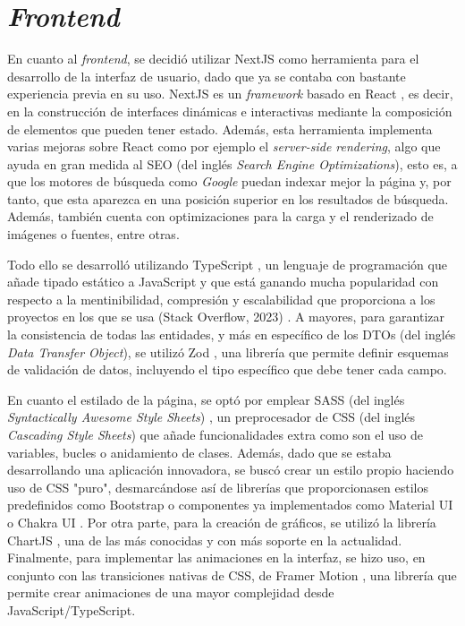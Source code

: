 \section{\textit{Frontend}}
\label{sec:herramientas_frontend}

En cuanto al \textit{frontend}, se decidió utilizar NextJS \cite{nextjs} como herramienta para el desarrollo de la interfaz de usuario, dado que ya
se contaba con bastante experiencia previa en su uso. NextJS es un \textit{framework} basado en React \cite{react}, es decir, en la construcción de interfaces dinámicas e interactivas mediante la composición
de elementos que pueden tener estado. Además, esta herramienta implementa varias mejoras sobre React como por ejemplo el \textit{server-side rendering}, algo que ayuda en gran medida
al SEO (del inglés \textit{Search Engine Optimizations}), esto es, a que los motores de búsqueda como \textit{Google} puedan indexar mejor la página y, por tanto, que esta aparezca en una posición superior en los resultados de búsqueda.
Además, también cuenta con optimizaciones para la carga y el renderizado de imágenes o fuentes, entre otras.

\bigskip
Todo ello se desarrolló utilizando TypeScript \cite{typescript}, un lenguaje de programación que añade tipado estático a JavaScript
y que está ganando mucha popularidad con respecto a la mentinibilidad, compresión y escalabilidad que proporciona a los proyectos en los que se usa (Stack Overflow, 2023) \cite{stackoverflow2023}.
A mayores, para garantizar la consistencia de todas las entidades, y más en específico de los DTOs (del inglés \textit{Data Transfer Object}), se utilizó Zod \cite{zod}, una librería que permite
definir esquemas de validación de datos, incluyendo el tipo específico que debe tener cada campo.

\bigskip
En cuanto el estilado de la página, se optó por emplear SASS (del inglés \textit{Syntactically Awesome Style Sheets}) \cite{sass}, un preprocesador de CSS (del inglés \textit{Cascading Style Sheets}) que añade
funcionalidades extra como son el uso de variables, bucles o anidamiento de clases. Además, dado que se estaba desarrollando
una aplicación innovadora, se buscó crear un estilo propio haciendo uso de CSS "puro", desmarcándose así de librerías que proporcionasen estilos predefinidos como Bootstrap \cite{bootstrap} o componentes ya implementados
como Material UI \cite{materialui} o Chakra UI \cite{chakraui}. Por otra parte, para la creación de gráficos, se utilizó la librería ChartJS \cite{chartjs}, una de las más conocidas
y con más soporte en la actualidad. Finalmente, para implementar las animaciones en la interfaz, se hizo uso, en conjunto con las transiciones nativas
de CSS, de Framer Motion \cite{framermotion}, una librería que permite crear animaciones de una mayor complejidad desde JavaScript/TypeScript.

